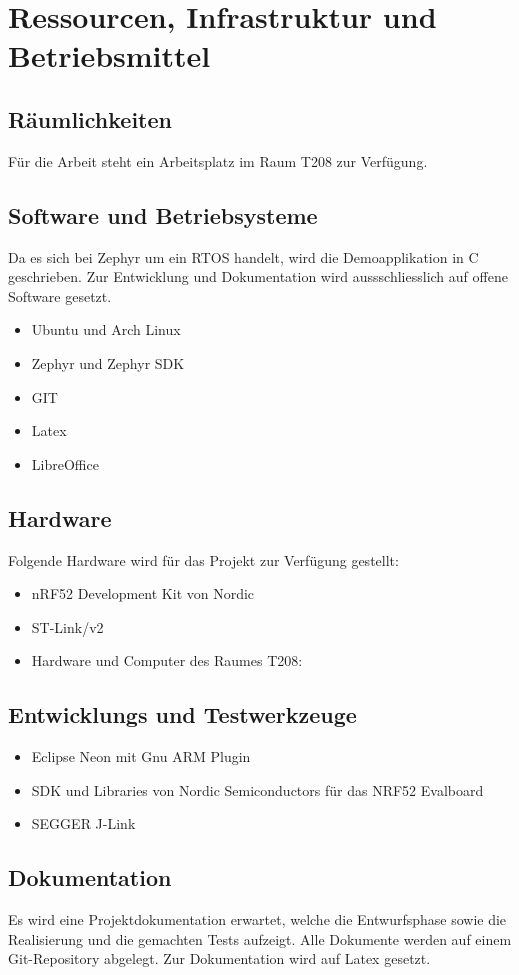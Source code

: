 \chapter{Ressourcen, Infrastruktur und Betriebsmittel}
\label{chap:ressourcen}


\section{Räumlichkeiten}

Für die Arbeit steht ein Arbeitsplatz im Raum T208 zur Verfügung.

\section{Software und Betriebsysteme}

Da es sich bei Zephyr um ein RTOS handelt, wird die Demoapplikation in C geschrieben. Zur Entwicklung und Dokumentation wird aussschliesslich auf offene Software gesetzt.

\begin{itemize}
	\item Ubuntu und Arch Linux
	\item Zephyr und Zephyr SDK
	\item GIT
	\item Latex
	\item LibreOffice
\end{itemize}

\section{Hardware}

Folgende Hardware wird für das Projekt zur Verfügung gestellt:

\begin{itemize}
	\item nRF52 Development Kit von Nordic
	\item ST-Link/v2
	\item Hardware und Computer des Raumes T208:
\end{itemize}

\section{Entwicklungs und Testwerkzeuge}

\begin{itemize}
	\item Eclipse Neon mit Gnu ARM Plugin
	\item SDK und Libraries von Nordic Semiconductors für das NRF52 Evalboard
	\item SEGGER J-Link
\end{itemize}

\section{Dokumentation}

Es wird eine Projektdokumentation erwartet, welche die Entwurfsphase sowie die Realisierung und die gemachten
Tests aufzeigt. Alle Dokumente werden auf einem Git-Repository abgelegt. Zur Dokumentation wird auf Latex gesetzt.
